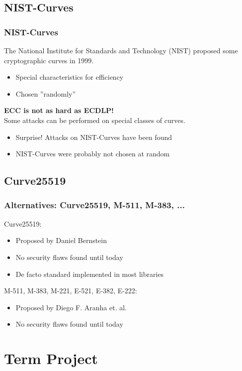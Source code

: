 \documentclass{beamer}
\begin{document}
\subsection{NIST-Curves}
\begin{frame}
	\frametitle{NIST-Curves}
	The National Institute for Standards and Technology (NIST) proposed some cryptographic curves in 1999.
	\begin{itemize}
		\item Special characteristics for efficiency
		\item Chosen ''randomly''
	\end{itemize}
	\vspace{1cm}
	\textbf{ECC is not as hard as ECDLP!} \\
	Some attacks can be performed on special classes of curves.
	\begin{itemize}
		\item Surprise! Attacks on NIST-Curves have been found
		\item NIST-Curves were probably not chosen at random
	\end{itemize}
	\cite{bernstein2016safecurves}
\end{frame}

\subsection{Curve25519}
\begin{frame}
	\frametitle{Alternatives: Curve25519, M-511, M-383, ...}
	Curve25519:
	\begin{itemize}
		\item Proposed by Daniel Bernstein \cite{bernstein2006curve25519}
		\item No security flaws found until today
		\item De facto standard implemented in most libraries
	\end{itemize}
	\vspace{1cm}
	M-511, M-383, M-221, E-521, E-382, E-222:
	\begin{itemize}
		\item Proposed by Diego F. Aranha et. al. \cite{cryptoeprint:2013:647}
		\item No security flaws found until today
	\end{itemize}
\end{frame}

\section{Term Project}
\end{document}
